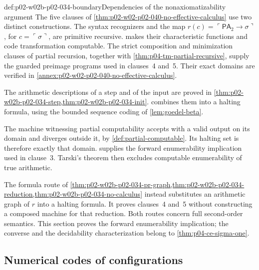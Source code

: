 \begin{proofboundary}{def:p02-w02b-p02-034-boundary}{Dependencies of the nonaxiomatizability argument}
The five clauses of \cref{thm:p02-w02-p02-040-no-effective-calculus}
use two distinct constructions. The syntax recognizers and the map
\(r(c)=\ulcorner\mathsf{PA}_2\to\sigma\urcorner\), for
\(c=\ulcorner\sigma\urcorner\), are primitive recursive.
 makes their characteristic
functions and code transformation computable. The strict composition
and minimization clauses of partial recursion, together with
\cref{thm:p04-tm-partial-recursive}, supply the guarded preimage
programs used in clauses~4 and~5. Their exact domains are verified in
\cref{annex:p02-w02-p02-040-no-effective-calculus}.

The arithmetic descriptions of a step and of the input are proved
in \cref{thm:p02-w02b-p02-034-step,thm:p02-w02b-p02-034-init}.
 combines them into a halting
formula, using the bounded sequence coding of \cref{lem:goedel-beta}.

The machine witnessing partial computability accepts with a valid
output on its domain and diverges outside it, by
\cref{def:partial-computable}. Its halting set is therefore exactly
that domain.  supplies the
forward enumerability implication used in clause~3. Tarski's theorem
then excludes computable enumerability of true arithmetic.

The formula route of
\cref{thm:p02-w02b-p02-034-pr-graph,thm:p02-w02b-p02-034-reduction,thm:p02-w02b-p02-034-no-calculus}
instead substitutes an arithmetic graph of \(r\) into a halting
formula. It proves clauses~4 and~5 without constructing a composed
machine for that reduction. Both routes concern full second-order
semantics. This section proves the forward enumerability implication;
the converse and the decidability characterization belong to
\cref{thm:p04-ce-sigma-one}.
\end{proofboundary}

\subsection{Numerical codes of configurations}
\label{sec:p02-w02b-p02-034-codes}

